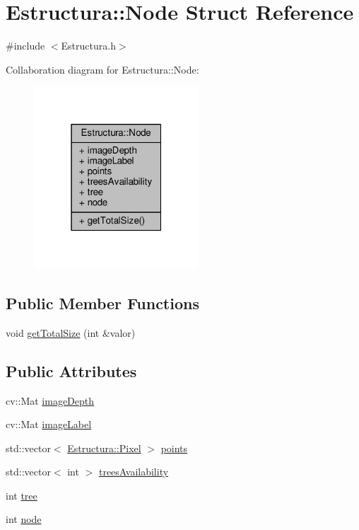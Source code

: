 \hypertarget{structEstructura_1_1Node}{}\section{Estructura\+:\+:Node Struct Reference}
\label{structEstructura_1_1Node}


{\ttfamily \#include $<$Estructura.\+h$>$}



Collaboration diagram for Estructura\+:\+:Node\+:
\nopagebreak
\begin{figure}[H]
\begin{center}
\leavevmode
\includegraphics[width=175pt]{structEstructura_1_1Node__coll__graph}
\end{center}
\end{figure}
\subsection*{Public Member Functions}
\begin{DoxyCompactItemize}
\item 
void \hyperlink{structEstructura_1_1Node_a5831e80817a1241fba2de601a9d6fda6}{get\+Total\+Size} (int \&valor)
\end{DoxyCompactItemize}
\subsection*{Public Attributes}
\begin{DoxyCompactItemize}
\item 
cv\+::\+Mat \hyperlink{structEstructura_1_1Node_a117720b249be79aaf71bc0a42d2c9b6b}{image\+Depth}
\item 
cv\+::\+Mat \hyperlink{structEstructura_1_1Node_a7905c0696cb214e84ac855e7a6b6366c}{image\+Label}
\item 
std\+::vector$<$ \hyperlink{structEstructura_1_1Pixel}{Estructura\+::\+Pixel} $>$ \hyperlink{structEstructura_1_1Node_a0ad44a6cbbffdcd39f26733cc0e6f196}{points}
\item 
std\+::vector$<$ int $>$ \hyperlink{structEstructura_1_1Node_aab4eb88cc631cf0829658ca0e7a313a4}{trees\+Availability}
\item 
int \hyperlink{structEstructura_1_1Node_abb400b36a5e8179766c35bc73c22e816}{tree}
\item 
int \hyperlink{structEstructura_1_1Node_a2e360ae2439d4d82dd38d9b30358feac}{node}
\end{DoxyCompactItemize}


